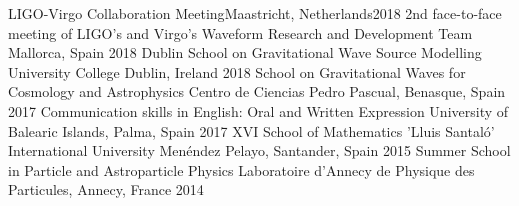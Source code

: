 
\begin{cvpress}
  \cvpres
   {LIGO-Virgo Collaboration Meeting}{Maastricht, Netherlands}{2018}
  \cvpres 
  {2nd face-to-face meeting of LIGO’s and Virgo’s Waveform Research and Development Team}
  {Mallorca, Spain}
  {2018} 
  \cvpres
  {Dublin School on Gravitational Wave Source Modelling}
  {University College Dublin, Ireland}
  {2018}
   \cvpres
   {School on Gravitational Waves for Cosmology and Astrophysics}
   {Centro de Ciencias Pedro Pascual, Benasque, Spain}
   {2017}
   \cvpres
   {Communication skills in English: Oral and Written Expression}
   {University of Balearic Islands, Palma, Spain}
    {2017}
   \cvpres
  {XVI School of Mathematics ’Lluis Santaló’}
  {International University Menéndez Pelayo, Santander, Spain}
  {2015}
   \cvpres
   {Summer School in Particle and Astroparticle Physics}
   {Laboratoire d’Annecy de Physique des Particules, Annecy, France}
   {2014}
\end{cvpress}\vspace{-10pt}
